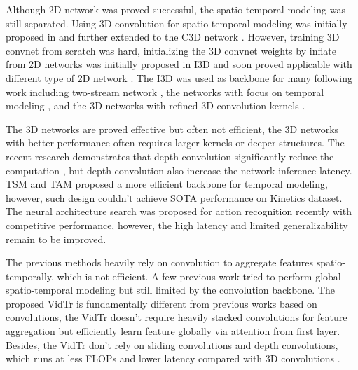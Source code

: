 \documentclass[10pt,twocolumn,letterpaper]{article}
\begin{document}
Although 2D network was proved successful, the spatio-temporal modeling was still separated. Using 3D convolution for spatio-temporal modeling was initially proposed in \cite{ji20123d} and further extended to the C3D network \cite{tran2015learning}. However, training 3D convnet from scratch was hard, initializing the 3D convnet weights by inflate from 2D networks was initially proposed in I3D \cite{carreira2017quo} and soon proved applicable with different type of 2D network \cite{hara2018can,chen2018multi,xie2017aggregated}.
The I3D was used as backbone for many following work including two-stream network \cite{wang2018non,feichtenhofer2018slowfast}, the networks with focus on temporal modeling \cite{li2020directional, li2020nuta,yang_CVPR2020_TPN}, and the 3D networks with refined 3D convolution kernels \cite{jiang_ICCV2019_STM,li_CVPR2020_TEA,liu_AAAI2020_TEINet,shao2020temporal}.

The 3D networks are proved effective but often not efficient, the 3D networks with better performance often requires larger kernels or deeper structures. The recent research demonstrates that depth convolution significantly reduce the computation \cite{tran2019video}, but depth convolution also increase the network inference latency. TSM \cite{lin2019tsm} and TAM \cite{fan2019more} proposed a more efficient backbone for temporal modeling, however, such design couldn't achieve SOTA performance on Kinetics dataset. The neural architecture search was proposed for action recognition \cite{feichtenhofer2020x3d,piergiovanni2019tiny} recently with competitive performance, however, the high latency and limited generalizability remain to be improved.

The previous methods heavily rely on convolution to aggregate features spatio-temporally, which is not efficient. A few previous work tried to perform global spatio-temporal modeling \cite{wang2018non,li2020nuta} but still limited by the convolution backbone. The proposed VidTr is fundamentally different from previous works based on convolutions, the VidTr doesn't require heavily stacked convolutions \cite{yang_CVPR2020_TPN} for feature aggregation but efficiently learn feature globally via attention from first layer. Besides, the VidTr don't rely on sliding convolutions and depth convolutions, which runs at less FLOPs and lower latency compared with 3D convolutions \cite{yang_CVPR2020_TPN,feichtenhofer2020x3d}.
\end{document}
